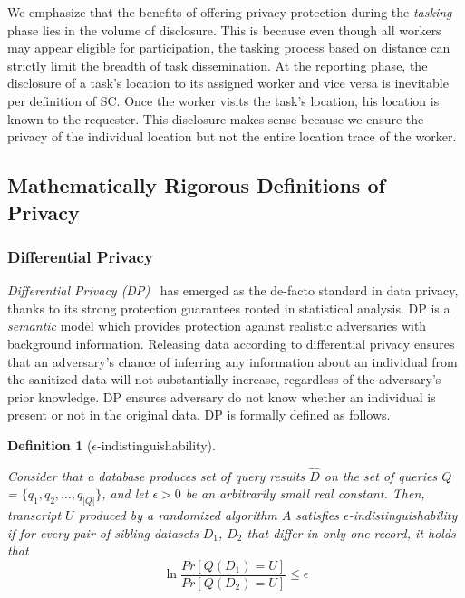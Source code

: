 \documentclass{USC-Thesis}
\numberwithin{equation}{chapter}
\begin{document}
We emphasize that the benefits of offering privacy protection during the \emph{tasking} phase lies in the volume of disclosure. This is because even though all workers may appear eligible for participation, the tasking process based on distance can strictly limit the breadth of task dissemination. At the reporting phase, the disclosure of a task's location to its assigned worker and vice versa is inevitable per definition of SC. Once the worker visits the task's location, his location is known to the requester. This disclosure makes sense because we ensure the privacy of the individual location but not the entire location trace of the worker.

\subsection{Mathematically Rigorous Definitions of Privacy}
\subsubsection{Differential Privacy}
{\em Differential Privacy (DP)}~\cite{dwork2006differential} has emerged as the de-facto standard in data privacy, thanks to its strong protection guarantees rooted in statistical analysis. DP is a {\em semantic} model which provides protection against realistic adversaries with background information. Releasing data according to differential privacy ensures that an adversary’s chance of inferring any information about an individual from the sanitized data will not substantially increase, regardless of the adversary's prior knowledge. DP ensures adversary do not know whether an individual is present or not in the original data. DP is formally defined as follows.


\newtheorem{differential_privacy}[definition]{Definition}\label{differential_privacy}
\begin{differential_privacy}[$\epsilon$-indistinguishability]~\cite{dwork2006calibrating}

Consider that a database produces set of query results $\hat{D}$ on the set of queries $Q$ = $\{q_1, q_2, \ldots, q_{|Q|}\}$, and let $\epsilon>0$ be an arbitrarily small real constant. Then, transcript $U$ produced by a randomized algorithm $A$ satisfies $\epsilon$-indistinguishability if for every pair of sibling datasets $D_1$, $D_2$ that differ in only one record, it holds that
$$\ln \frac{Pr[Q(D_1) = U]}{Pr[Q(D_2) = U]} \le \epsilon$$
\end{differential_privacy}
\end{document}
